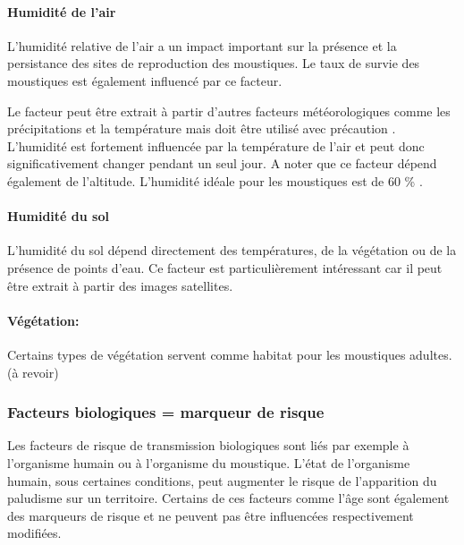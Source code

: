%

\paragraph{Humidité de l'air}
L'humidité relative de l'air a un impact important sur la présence et la persistance des sites de reproduction des moustiques. Le taux de survie des moustiques est également influencé par ce facteur.

Le facteur peut être extrait à partir d'autres facteurs météorologiques comme les précipitations et la température mais doit être utilisé avec précaution . L'humidité est fortement influencée par la température de l'air et peut donc significativement changer pendant un seul jour. A noter que ce facteur dépend également de l'altitude. L'humidité idéale pour les moustiques est de 60 \% \citep{Protopopoff2009}.


\paragraph{Humidité du sol}
L'humidité du sol dépend directement des températures, de la végétation ou de la présence de points d'eau. Ce facteur est particulièrement intéressant car il peut être extrait à partir des images satellites. \citep{Machault2011}

\paragraph{Végétation:}

Certains types de végétation servent comme habitat pour les moustiques adultes.\citep{Minakawa1999} (à revoir)

\newpage

\subsubsection{Facteurs biologiques = marqueur de risque}

Les facteurs de risque de transmission biologiques sont liés par exemple à l'organisme humain ou à l'organisme du moustique. L'état de l'organisme humain, sous certaines conditions, peut augmenter le risque de l'apparition du paludisme sur un territoire. Certains de ces facteurs comme l'âge sont également des marqueurs de risque et ne peuvent pas être influencées respectivement modifiées.\\

